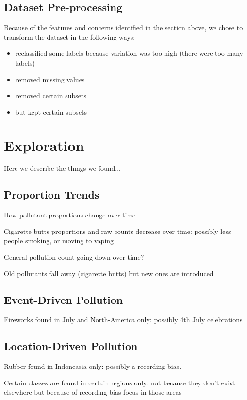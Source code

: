 \documentclass[10pt]{article}\usepackage[]{graphicx}\usepackage[]{color}
\begin{document}
\subsection{Dataset Pre-processing}

Because of the features and concerns identified in the section above, we chose to transform the dataset in the following ways:
\begin{itemize}
\item reclassified some labels because variation was too high (there were too many labels)
\item removed missing values
\item removed certain subsets
\item but kept certain subsets
\end{itemize}

\section{Exploration}

Here we describe the things we found... 

\subsection{Proportion Trends}
How pollutant proportions change over time.

Cigarette butts proportions and raw counts decrease over time: possibly less people smoking, or moving to vaping

General pollution count going down over time?

Old pollutants fall away (cigarette butts) but new ones are introduced

\subsection{Event-Driven Pollution}

Fireworks found in July and North-America only: possibly 4th July celebrations

\subsection{Location-Driven Pollution}

Rubber found in Indoneasia only: possibly a recording bias.

Certain classes are found in certain regions only: not because they don't exist elsewhere but because of recording bias focus in those areas
\end{document}

